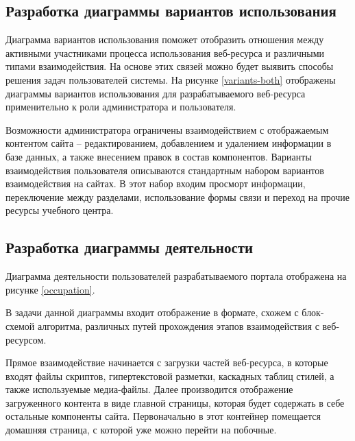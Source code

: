 \subsection{Разработка диаграммы вариантов использования}

Диаграмма вариантов использования поможет отобразить отношения между активными участниками процесса использования веб-ресурса и различными типами взаимодействия.
На основе этих связей можно будет выявить способы решения задач пользователей системы.
На рисунке \ref{variants-both} отображены диаграммы вариантов использования для разрабатываемого веб-ресурса применительно к роли администратора и пользователя.


Возможности администратора ограничены взаимодействием с отображаемым контентом сайта -- редактированием, добавлением и удалением информации в базе данных, а также внесением правок в состав компонентов.
Варианты взаимодействия пользователя описываются стандартным набором вариантов взаимодействия на сайтах.
В этот набор входим просморт информации, переключение между разделами, использование формы связи и переход на прочие ресурсы учебного центра.

\subsection{Разработка диаграммы деятельности}

Диаграмма деятельности пользователей разрабатываемого портала отображена на рисунке \ref{occupation}.


В задачи данной диаграммы входит отображение в формате, схожем с блок-схемой алгоритма, различных путей прохождения этапов взаимодействия с веб-ресурсом.

Прямое взаимодействие начинается с загрузки частей веб-ресурса, в которые входят файлы скриптов, гипертекстовой разметки, каскадных таблиц стилей, а также используемые медиа-файлы.
Далее производится отображение загруженного контента в виде главной страницы, которая будет содержать в себе остальные компоненты сайта.
Первоначально в этот контейнер помещается домашняя страница, с которой уже можно перейти на побочные.

